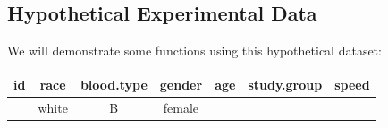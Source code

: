 \documentclass[]{book}
\newenvironment{Shaded}{\begin{snugshade}}{\end{snugshade}}
\newcommand{\KeywordTok}[1]{\textcolor[rgb]{0.13,0.29,0.53}{\textbf{#1}}}
\newcommand{\NormalTok}[1]{#1}
\newcommand{\OperatorTok}[1]{\textcolor[rgb]{0.81,0.36,0.00}{\textbf{#1}}}
\newcommand{\StringTok}[1]{\textcolor[rgb]{0.31,0.60,0.02}{#1}}
\theoremstyle{definition}
\theoremstyle{definition}
\theoremstyle{definition}
\theoremstyle{remark}
\begin{document}
\hypertarget{hypothetical-experimental-data}{%
\subsection{Hypothetical Experimental
Data}\label{hypothetical-experimental-data}}

We will demonstrate some functions using this hypothetical dataset:

\begin{Shaded}
\end{Shaded}

\begin{longtable}[]{@{}ccccccc@{}}
\toprule
\begin{minipage}[b]{0.06\columnwidth}\centering
id\strut
\end{minipage} & \begin{minipage}[b]{0.09\columnwidth}\centering
race\strut
\end{minipage} & \begin{minipage}[b]{0.15\columnwidth}\centering
blood.type\strut
\end{minipage} & \begin{minipage}[b]{0.10\columnwidth}\centering
gender\strut
\end{minipage} & \begin{minipage}[b]{0.07\columnwidth}\centering
age\strut
\end{minipage} & \begin{minipage}[b]{0.16\columnwidth}\centering
study.group\strut
\end{minipage} & \begin{minipage}[b]{0.09\columnwidth}\centering
speed\strut
\end{minipage}\tabularnewline
\midrule
\endhead
\begin{minipage}[t]{0.06\columnwidth}\centering
1\strut
\end{minipage} & \begin{minipage}[t]{0.09\columnwidth}\centering
white\strut
\end{minipage} & \begin{minipage}[t]{0.15\columnwidth}\centering
B\strut
\end{minipage} & \begin{minipage}[t]{0.10\columnwidth}\centering
female\strut
\end{minipage} & \begin{minipage}[t]{0.07\columnwidth}\centering

\end{minipage}
\end{longtable}
\end{document}
